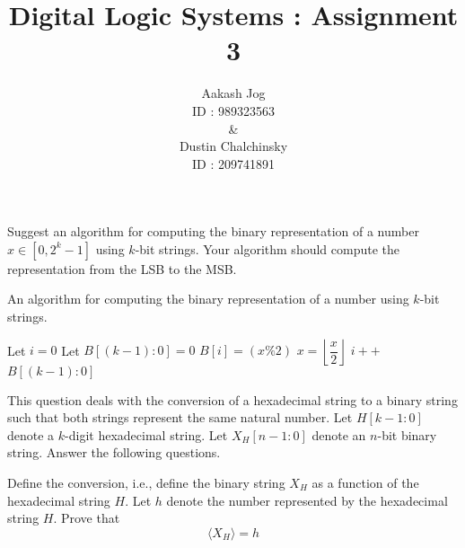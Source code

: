 \documentclass[fleqn, a4paper, 12pt, oneside]{amsart}
\title{Digital Logic Systems : Assignment 3}
\author{
	Aakash Jog\\
	ID : 989323563\\
	\&\\
	Dustin Chalchinsky\\
	ID : 209741891
	}
\date{\formatdate{14}{4}{2015}}
\theoremstyle{definition}
\theoremstyle{theorem}
\begin{document}
	
\maketitle

\begin{question}
	Suggest an algorithm for computing the binary representation of a number $x \in [0, 2^k - 1]$ using $k$-bit strings. Your algorithm should compute the representation from the LSB to the MSB.
\end{question}

\begin{solution}
	\begin{algorithm}
		\caption{An algorithm for computing the binary representation of a number using $k$-bit strings.}
		\begin{algorithmic}[1]
			\State Let $i = 0$
			\State Let $B[(k - 1) : 0] = 0$
				\State $B[i] = (x \% 2)$
				\State $x = \left\lfloor \dfrac{x}{2} \right\rfloor$
				\State $i++$
			\EndWhile
			\State \Return $B[(k - 1) : 0]$
		\end{algorithmic}
	\end{algorithm}
\end{solution}

\begin{question}
	This question deals with the conversion of a hexadecimal string to a binary string such that both strings represent the same natural number. Let $H[k - 1 : 0]$ denote a $k$-digit hexadecimal string. Let $X_H[n - 1 : 0]$ denote an $n$-bit binary string. Answer the following questions.
	\begin{tasks}
		\task 
			Define the conversion, i.e., define the binary string $X_H$ as a function of the hexadecimal string $H$.
		\task 
			Let $h$ denote the number represented by the hexadecimal string $H$.
			Prove that
			\begin{equation*}
				\langle X_H \rangle = h
			\end{equation*}
	\end{tasks}
\end{question}
\end{document}
